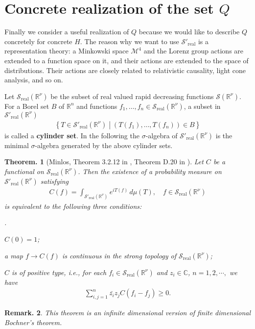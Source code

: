 \documentclass[openany, a4paper, oneside]{jsbook}
\newcounter{enum2}
\renewenvironment{enumerate}{%
\begin{list}%
{%
\arabic{enum2}.\ \,%
}%
{%
\usecounter{enum2}
\setlength{\itemindent}{0pt}%
\setlength{\leftmargin}{15pt}%
\setlength{\rightmargin}{0pt}%
\setlength{\labelsep}{0pt}%
\setlength{\labelwidth}{6pt}%
\setlength{\itemsep}{0pt}%
\setlength{\parsep}{0pt}%
\setlength{\listparindent}{0pt}%
}
}{%
\end{list}%
}
\theoremstyle{break}
\theoremstyle{breakdefn}
\newtheorem{thm}{Theorem.}[section]
\newtheorem{rem}[thm]{Remark.}
\newcommand{\rbk}[1]{\left (#1\right)}
\newcommand{\relmiddle}[1]{\mathrel{}\middle#1\mathrel{}}
\newcommand{\set}[2]{\left\{#1 \relmiddle| #2\right\}}
\newcommand{\bbC}{\mathbb{C}}
\newcommand{\bbR}{\mathbb{R}}
\newcommand{\bbRnu}{\mathbb{R}^{\nu}}
\newcommand{\calM}{\mathcal{M}}
\newcommand{\calS}{\mathcal{S}}
\newcommand{\realtempereddist}{\mathcal{S}'_{\mathrm{real}}}
\newcommand{\realrapiddecrease}{\mathcal{S}_{\mathrm{real}}}
\begin{document}
\section{Concrete realization of the set $Q$}


Finally we consider a useful realization of $Q$ because we would like to describe $Q$ concretely for concrete $H$.
The reason why we want to use $\realtempereddist$ is a representation theory:
a Minkowski space $\calM^4$ and the Lorenz group actions are extended to a function space on it,
and their actions are extended to the space of distributions.
Their actions are closely related to relativistic causality, light cone analysis, and so on.

Let $\realrapiddecrease (\bbRnu)$ be the subset of real valued rapid decreasing functions $\calS (\bbRnu)$.
For a Borel set $B$ of $\bbR^n$ and functions $f_1, \dots, f_n \in \realrapiddecrease (\bbRnu)$,
a subset in $\realtempereddist (\bbRnu)$
\begin{align}
 \set{ T \in \realtempereddist (\bbRnu)}{\rbk{T (f_1), \dots, T (f_n)} \in B}
\end{align}
is called a \textbf{cylinder set}.
In the following the $\sigma$-algebra of $\realtempereddist (\bbRnu)$ is the minimal $\sigma$-algebra
generated by the above cylinder sets.

\begin{thm}[Minlos, Theorem 3.2.12 in \cite{AraiEzawa3}, Theorem D.20 in \cite{AsaoArai5}]
 Let $C$ be a functional on $\realrapiddecrease (\bbRnu)$.
 Then the existence of a probability measure on $\realtempereddist (\bbRnu)$ satisfying
 \begin{align}
  C (f)
  =
  \int_{\realtempereddist (\bbRnu)} e^{i T (f)} \, d \mu (T), \quad f \in \realrapiddecrease (\bbRnu)
 \end{align}
 is equivalent to the following three conditions:
\begin{enumerate}
\item $C (0) = 1$;
\item a map $f \to C (f)$ is continuous in the strong topology of $\realrapiddecrease (\bbRnu)$;
\item $C$ is of positive type, i.e., for each $f_i \in \realrapiddecrease (\bbRnu)$ and $z_i \in \bbC$, $n=1,2,\cdots,$ we have
    \begin{align}
     \sum_{i,j = 1}^{n} \bar{z_i} z_j C (f_i - f_j) \geq 0.
    \end{align}
\end{enumerate}
\end{thm}
\begin{rem}
 This theorem is an infinite dimensional version of finite dimensional Bochner's theorem.
\end{rem}
\end{document}
